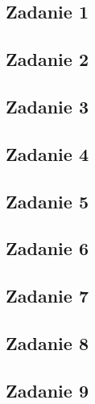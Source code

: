 \subsection{Zadanie 1}


\subsection{Zadanie 2}


\subsection{Zadanie 3}


\subsection{Zadanie 4}


\subsection{Zadanie 5}


\subsection{Zadanie 6}


\subsection{Zadanie 7}


\subsection{Zadanie 8}


\subsection{Zadanie 9}

